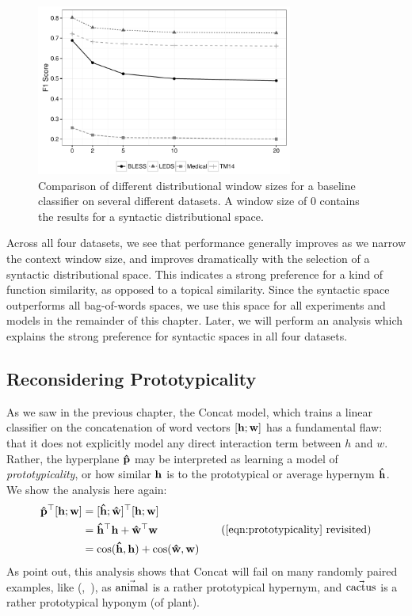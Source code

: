 \begin{figure}
  \centering
  \includegraphics[width=0.75\textwidth]{plots/window.pdf}
  \caption{Comparison of different distributional window sizes for a baseline
  classifier on several different datasets. A window size of 0 contains the
  results for a syntactic distributional space.}
  \label{fig:window}
\end{figure}

Across all four datasets, we see that performance generally improves as
we narrow the context window size, and improves dramatically with the
selection of a syntactic distributional space. This indicates a strong
preference for a kind of function similarity, as opposed to a topical
similarity. Since the syntactic space outperforms all bag-of-words spaces,
we use this space for all experiments and models in the remainder of this
chapter. Later, we will perform an analysis which explains the strong
preference for syntactic spaces in all four datasets.

\subsection{Reconsidering Prototypicality}

As we saw in the previous chapter, the Concat model, which trains a linear
classifier on the concatenation of word vectors $[{\mathbf{h}}; {\mathbf{w}}]$ has a fundamental
flaw: that it does not explicitly model any direct interaction term between
$h$ and $w$. Rather, the hyperplane ${\mathbf{\hat p}}$ may be interpreted as learning
a model of {\em prototypicality}, or how similar ${\mathbf{h}}$ is to the prototypical
or average hypernym ${\mathbf{\hat h}}$. We show the analysis here again:
\begin{align}
  \begin{split}
  \vhatp^\top \wordpair & = \protopair^\top \wordpair\\
  & = \vhath^\top\vh + \vhatw^\top\vw\\
  & = \mbox{cos}(\vhath, \vh) + \mbox{cos}(\vhatw, \vw)
  \end{split}
\tag{\ref{eqn:prototypicality} revisited}
\end{align}
As  point out, this analysis shows that Concat will
fail on many randomly paired examples, like (,~), as
$\vec{\mbox{animal}}$ is a rather prototypical hypernym, and $\vec{\mbox{cactus}}$ is
a rather prototypical hyponym (of plant).

